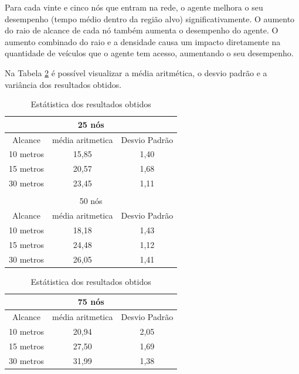 	Para cada vinte e cinco nós que entram na rede, o agente melhora o seu desempenho (tempo médio dentro da região alvo) significativamente. O aumento do raio de alcance de cada nó também aumenta o desempenho do agente. O aumento combinado do raio e a densidade causa um impacto diretamente na quantidade de veículos que o agente tem acesso, aumentando o seu desempenho.

	Na Tabela \ref{tab:estatiscaResultadosObtidosComInfraestrutura} é possível visualizar a média aritmética, o desvio padrão e a variância dos resultados obtidos.

	\begin{table}[!htb]
	    \caption{Estátistica dos resultados obtidos}
	    \label{tab:estatiscaResultadosObtidosComInfraestrutura}
	    \centering
	    \tiny
	    \begin{minipage}{.5\linewidth}
	      
	      \centering
	        \begin{tabular}{|c|c|c|}

			\hline
			\multicolumn{3}{|c|}{25 nós} \\ \hline
			Alcance   & média aritmetica &	Desvio Padrão   \\ \hline
			10 metros &	15,85 & 1,40   \\ \hline
			15 metros &	20,57 & 1,68   \\ \hline
			30 metros &	23,45 & 1,11  \\ \hline

			\multicolumn{3}{|c|}{} \\ \hline

			\multicolumn{3}{|c|}{50 nós} \\ \hline
			Alcance   & média aritmetica &	Desvio Padrão   \\ \hline
			10 metros &	18,18 & 1,43   \\ \hline
			15 metros &	24,48 & 1,12  \\ \hline
			30 metros &	26,05 & 1,41  \\ \hline

		\end{tabular}
	    \end{minipage}%
	    \begin{minipage}{.5\linewidth}
	      \centering
	        \begin{tabular}{|c|c|c|}
	        \hline
			\multicolumn{3}{|c|}{75 nós} \\ \hline
			Alcance   & média aritmetica &	Desvio Padrão   \\ \hline
			10 metros &	20,94 & 2,05   \\ \hline
			15 metros &	27,50 & 1,69   \\ \hline
			30 metros &	31,99 & 1,38 \\ \hline


\end{tabular}
\end{minipage}
\end{table}
